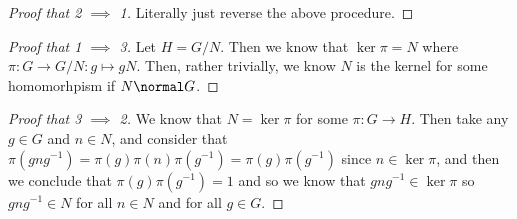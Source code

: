 \begin{proof}[Proof that 2 $\implies$ 1]
Literally just reverse the above procedure.
\end{proof}

\begin{proof}[Proof that 1 $\implies$ 3]
Let $H = G / N$. Then we know that $\ker \pi = N$ where $\pi : G \to G/N : g \mapsto gN$. Then, rather trivially, we know $N$ is the kernel for some homomorhpism if $N \normal G$.
\end{proof}

\begin{proof}[Proof that 3 $\implies$ 2]
We know that $N = \ker \pi$ for some $\pi : G \to H$. Then take any $g \in G$ and $n \in N$, and consider that $\pi(gng^{-1}) = \pi(g)\pi(n)\pi(g^{-1}) = \pi(g)\pi(g^{-1})$ since $n \in \ker \pi$, and then we conclude that $\pi(g)\pi(g^{-1}) = 1$ and so we know that $gng^{-1} \in \ker\pi$ so $gng^{-1} \in N$ for all $n \in N$ and for all $g \in G$.
\end{proof}
